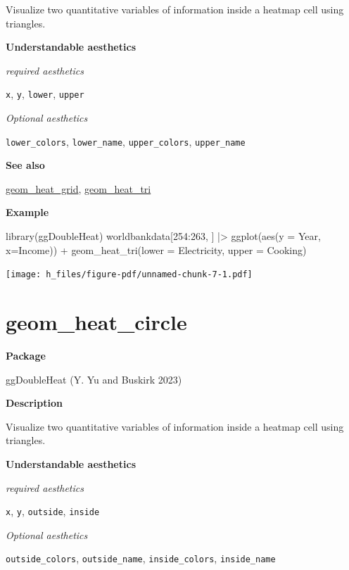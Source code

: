 \documentclass[
  letterpaper,
  DIV=11,
  numbers=noendperiod]{scrreprt}
\newenvironment{Shaded}{\begin{snugshade}}{\end{snugshade}}
\newcommand{\AttributeTok}[1]{\textcolor[rgb]{0.40,0.45,0.13}{#1}}
\newcommand{\DecValTok}[1]{\textcolor[rgb]{0.68,0.00,0.00}{#1}}
\newcommand{\FunctionTok}[1]{\textcolor[rgb]{0.28,0.35,0.67}{#1}}
\newcommand{\NormalTok}[1]{\textcolor[rgb]{0.00,0.23,0.31}{#1}}
\newcommand{\SpecialCharTok}[1]{\textcolor[rgb]{0.37,0.37,0.37}{#1}}
\begin{document}
Visualize two quantitative variables of information inside a heatmap
cell using triangles.

\textbf{Understandable aesthetics}

\emph{required aesthetics}

\texttt{x}, \texttt{y}, \texttt{lower}, \texttt{upper}

\emph{Optional aesthetics}

\texttt{lower\_colors}, \texttt{lower\_name}, \texttt{upper\_colors},
\texttt{upper\_name}

\textbf{See also}

\hyperref[heat_grid]{geom\_heat\_grid},
\hyperref[heat_tri]{geom\_heat\_tri}

\textbf{Example}

\begin{Shaded}
\begin{Highlighting}[]
\FunctionTok{library}\NormalTok{(ggDoubleHeat)}
\NormalTok{worldbankdata[}\DecValTok{254}\SpecialCharTok{:}\DecValTok{263}\NormalTok{, ] }\SpecialCharTok{|\textgreater{}}
  \FunctionTok{ggplot}\NormalTok{(}\FunctionTok{aes}\NormalTok{(}\AttributeTok{y =}\NormalTok{ Year, }\AttributeTok{x=}\NormalTok{Income)) }\SpecialCharTok{+} 
  \FunctionTok{geom\_heat\_tri}\NormalTok{(}\AttributeTok{lower =}\NormalTok{ Electricity,}
           \AttributeTok{upper =}\NormalTok{ Cooking) }
\end{Highlighting}
\end{Shaded}

\texttt{[image: h\_files/figure-pdf/unnamed-chunk-7-1.pdf]}

\section{geom\_heat\_circle}\label{heat_circle}

\textbf{Package}

ggDoubleHeat (Y. Yu and Buskirk 2023)

\textbf{Description}

Visualize two quantitative variables of information inside a heatmap
cell using triangles.

\textbf{Understandable aesthetics}

\emph{required aesthetics}

\texttt{x}, \texttt{y}, \texttt{outside}, \texttt{inside}

\emph{Optional aesthetics}

\texttt{outside\_colors}, \texttt{outside\_name},
\texttt{inside\_colors}, \texttt{inside\_name}
\end{document}
